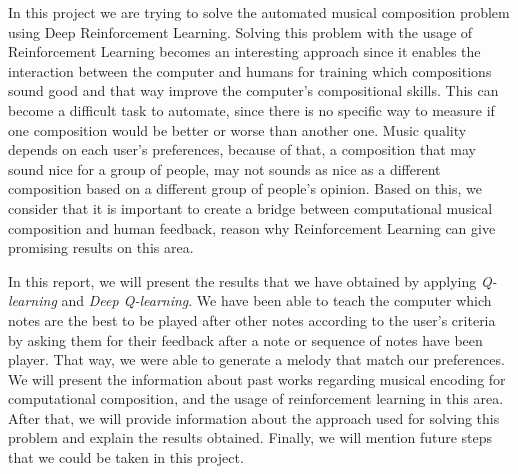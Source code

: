 In this project we are trying to solve the automated musical composition problem using Deep Reinforcement Learning. Solving this problem with the usage of Reinforcement Learning becomes an interesting approach since it enables the interaction between the computer and humans for training which compositions sound good and that way improve the computer's compositional skills. This can become a difficult task to automate, since there is no specific way to measure if one composition would be better or worse than another one. Music quality depends on each user's preferences, because of that, a composition that may sound nice for a group of people, may not sounds as nice as a different composition based on a different group of people's opinion. Based on this, we consider that it is important to create a bridge between computational musical composition and human feedback, reason why Reinforcement Learning can give promising results on this area.

In this report, we will present the results that we have obtained by applying \emph{Q-learning} and \emph{Deep Q-learning}. We have been able to teach the computer which notes are the best to be played after other notes according to the user's criteria by asking them for their feedback after a note or sequence of notes have been player. That way, we were able to generate a melody that match our preferences. We will present the information about past works regarding musical encoding for computational composition, and the usage of reinforcement learning in this area. After that, we will provide information about the approach used for solving this problem and explain the results obtained. Finally, we will mention future steps that we could be taken in this project.